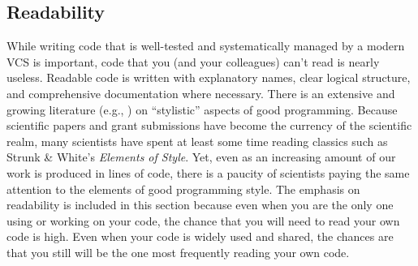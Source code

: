 \documentclass[ChapterTOCs,krantz2]{krantz} %
\theoremstyle{definition}
\begin{document}
%
%
%
%
%
%
%
%

\subsection{Readability}

While writing code that is well-tested and systematically managed by a modern
VCS is important, code that you (and your colleagues) can't read is
nearly useless. Readable code is written with explanatory names, clear logical
structure, and comprehensive documentation where necessary.  There is an
extensive and growing literature (e.g., \cite{boswell2011art, Fow00,
kernighan1999practice, HT00, mcconnell2009code}) on ``stylistic'' aspects of
good programming. Because scientific papers and grant submissions have become
the currency of the scientific realm, many scientists have spent at least some time reading classics such as Strunk \&
White's \emph{Elements of Style}. Yet, even as an increasing amount of our
work is produced in lines of code, there is a paucity of scientists paying the
same attention to the elements of good programming style. The emphasis on
readability is included in this section because even when you are the only one
using or working on your code, the chance that you will need to read your own
code is high. Even when your code is widely used and shared, the chances are
that you still will be the one most frequently reading your own code.
\end{document}
